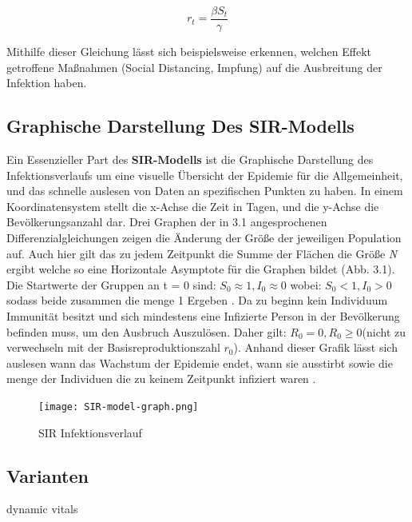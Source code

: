 \documentclass[12pt]{scrartcl} %
\begin{document}
$$ r_{t} = \frac{\beta S_{t}}{\gamma} $$

Mithilfe dieser Gleichung lässt sich beispielsweise erkennen, welchen Effekt getroffene Maßnahmen (Social Distancing, Impfung) auf die Ausbreitung der Infektion haben.


\subsection{Graphische Darstellung Des SIR-Modells}

Ein Essenzieller Part des \textbf{SIR-Modells} ist die Graphische Darstellung des Infektionsverlaufs um eine visuelle Übersicht der Epidemie für die Allgemeinheit, und das schnelle auslesen von Daten an spezifischen Punkten zu haben.
In einem Koordinatensystem stellt die x-Achse die Zeit in Tagen, und die y-Achse die Bevölkerungsanzahl dar. Drei Graphen der in 3.1 angesprochenen Differenzialgleichungen zeigen die Änderung der Größe der jeweiligen Population auf.
Auch hier gilt das zu jedem Zeitpunkt die Summe der Flächen die Größe \textit{N} ergibt welche so eine Horizontale Asymptote für die Graphen bildet (Abb. 3.1).
Die Startwerte der Gruppen an t = 0 sind: 
$S_{0} \approx 1, I_{0} \approx 0$ wobei: $ S_{0} < 1, I_{0} > 0$ sodass beide zusammen die menge 1 Ergeben \cite{4}.
Da zu beginn kein Individuum Immunität besitzt und sich mindestens eine Infizierte Person in der Bevölkerung befinden muss, um den Ausbruch Auszulösen. Daher gilt: $R_{0} = 0, R_{0} \geq 0 $(nicht zu verwechseln mit der Basisreproduktionszahl $r_{0}$).
Anhand dieser Grafik lässt sich auslesen wann das Wachstum der Epidemie endet, wann sie ausstirbt sowie die menge der Individuen die zu keinem Zeitpunkt infiziert waren \cite{1}.

	\begin{figure}[h]
	\centering
	\texttt{[image: SIR-model-graph.png]} 
	\caption[SIR Infektionsverlauf,\newline https://www.davidketcheson.info/2020/03/17/SIR\textunderscore model.html]{SIR Infektionsverlauf}
	\end{figure}


\subsection{Varianten}

dynamic vitals
\end{document}
